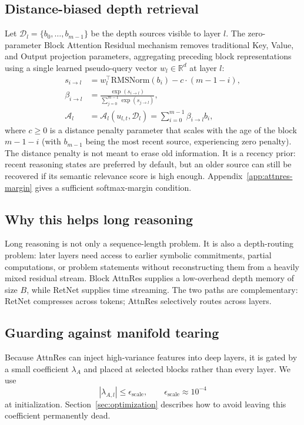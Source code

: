 \documentclass[11pt]{article}
\newcommand{\Att}{\mathcal{A}}
\newcommand{\RMS}{\mathrm{RMSNorm}}
\begin{document}
\subsection{Distance-biased depth retrieval}

Let $\mathcal{D}_l=\{b_0,\ldots,b_{m-1}\}$ be the depth sources visible to layer $l$. The zero-parameter Block Attention Residual mechanism removes traditional Key, Value, and Output projection parameters, aggregating preceding block representations using a single learned pseudo-query vector $w_l \in \mathbb{R}^d$ at layer $l$:
\begin{align}
\label{eq:attnres-score}
s_{i\to l} &= w_l^\top \RMS(b_i) - c \cdot (m - 1 - i), \\
\beta_{i\to l} &= \frac{\exp(s_{i\to l})}{\sum_{j=0}^{m-1}\exp(s_{j\to l})}, \\
\Att_l &= \Att_l(u_{l,t}, \mathcal{D}_l) = \sum_{i=0}^{m-1} \beta_{i\to l} b_i,
\end{align}
where $c \geq 0$ is a distance penalty parameter that scales with the age of the block $m-1-i$ (with $b_{m-1}$ being the most recent source, experiencing zero penalty).
The distance penalty is not meant to erase old information. It is a recency prior: recent reasoning states are preferred by default, but an older source can still be recovered if its semantic relevance score is high enough. Appendix~\ref{app:attnres-margin} gives a sufficient softmax-margin condition.

\subsection{Why this helps long reasoning}

Long reasoning is not only a sequence-length problem. It is also a depth-routing problem: later layers need access to earlier symbolic commitments, partial computations, or problem statements without reconstructing them from a heavily mixed residual stream. Block AttnRes supplies a low-overhead depth memory of size $B$, while RetNet supplies time streaming. The two paths are complementary: RetNet compresses across tokens; AttnRes selectively routes across layers.

\subsection{Guarding against manifold tearing}

Because AttnRes can inject high-variance features into deep layers, it is gated by a small coefficient $\lambda_A$ and placed at selected blocks rather than every layer. We use
\begin{equation}
|\lambda_{A,l}|\leq \epsilon_{\mathrm{scale}},\qquad \epsilon_{\mathrm{scale}}\approx 10^{-4}
\end{equation}
at initialization. Section~\ref{sec:optimization} describes how to avoid leaving this coefficient permanently dead.
\end{document}
